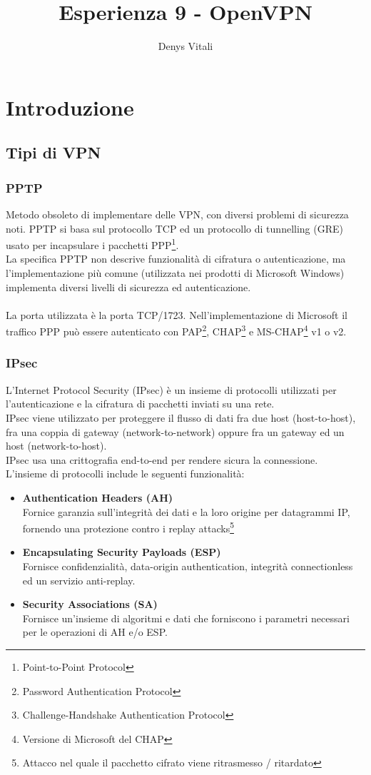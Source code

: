 \documentclass{article}
\author{Denys Vitali}
\title{Esperienza 9 - OpenVPN}
\begin{document}
\maketitle
\pagebreak
\section{Introduzione}
\subsection{Tipi di VPN}
\subsubsection{PPTP}
Metodo obsoleto di implementare delle VPN, con diversi problemi di sicurezza noti.
PPTP si basa sul protocollo TCP ed un protocollo di tunnelling (GRE) usato per incapsulare i pacchetti PPP\footnote{Point-to-Point Protocol}.
\\
La specifica PPTP non descrive funzionalità di cifratura o autenticazione, ma l'implementazione 
più comune (utilizzata nei prodotti di Microsoft Windows) implementa diversi livelli di sicurezza ed autenticazione. \\
\\
La porta utilizzata è la porta TCP/1723. Nell'implementazione di Microsoft il traffico PPP può essere
autenticato con PAP\footnote{Password Authentication Protocol}, CHAP\footnote{Challenge-Handshake Authentication Protocol} e MS-CHAP\footnote{Versione di Microsoft del CHAP} v1 o v2.

\subsubsection{IPsec}
L'Internet Protocol Security (IPsec) è un insieme di protocolli utilizzati per l'autenticazione e la cifratura di pacchetti inviati su una rete.\\
IPsec viene utilizzato per proteggere il flusso di dati fra due host (host-to-host), fra
una coppia di gateway (network-to-network) oppure fra un gateway ed un host (network-to-host).\\
IPsec usa una crittografia end-to-end per rendere sicura la connessione.
\\
L'insieme di protocolli include le seguenti funzionalità:
\begin{itemize}
    \item \textbf{Authentication Headers (AH)}\\
    Fornice garanzia sull'integrità dei dati e la loro origine per datagrammi IP, fornendo una protezione contro i replay attacks\footnote{Attacco nel quale il pacchetto cifrato viene ritrasmesso / ritardato}
    \item \textbf{Encapsulating Security Payloads (ESP)}\\
    Fornisce confidenzialità, data-origin authentication, integrità connectionless ed un servizio anti-replay.
    \item \textbf{Security Associations (SA)}\\
    Fornisce un'insieme di algoritmi e dati che forniscono i parametri necessari per le operazioni di AH e/o ESP.
\end{itemize}
\end{document}
